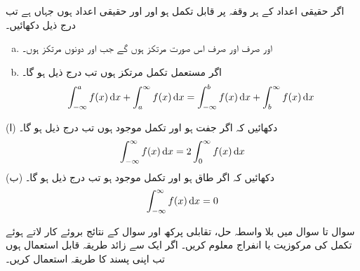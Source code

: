 اگر حقیقی اعداد کے ہر وقفہ پر  قابل تکمل ہو اور  اور  حقیقی اعداد ہوں جہاں  ہے تب  درج ذیل دکھائیں۔
\begin{enumerate}[a.]
\item
{} اور  صرف اور صرف اس صورت مرتکز ہوں گے جب  اور  دونوں مرتکز ہوں۔
\item
اگر مستعمل تکمل مرتکز ہوں تب درج ذیل ہو گا۔
\begin{align*}
\int_{-\infty}^af(x)\dif x+\int_a^{\infty}f(x)\dif x=\int_{-\infty}^bf(x)\dif x+\int_b^{\infty}f(x)\dif x
\end{align*}
\end{enumerate}
(ا) دکھائیں کہ اگر  جفت ہو اور تکمل موجود ہوں تب درج ذیل ہو گا۔
\begin{align*}
\int_{-\infty}^{\infty}f(x)\dif x=2\int_0^{\infty}f(x)\dif x
\end{align*}
(ب) دکھائیں کہ اگر  طاق ہو اور تکمل موجود ہو تب درج ذیل ہو گا۔
\begin{align*}
\int_{-\infty}^{\infty}f(x)\dif x=0
\end{align*}

سوال تا سوال  میں بلا واسطہ حل، تقابلی پرکھ اور سوال  کے نتائج بروئے کار لاتے ہوئے  تکمل کی مرکوزیت یا انفراج معلوم کریں۔ اگر ایک سے زائد طریقہ قابل استعمال ہوں تب اپنی پسند کا طریقہ استعمال کریں۔

